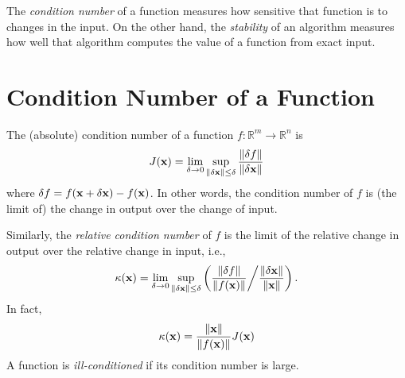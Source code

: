 \label{lab:conditioning_stability}



%

The \emph{condition number} of a function measures how sensitive that function is to changes in the input.
On the other hand, the \emph{stability} of an algorithm measures how well that algorithm computes the value of a function from exact input.

\section*{Condition Number of a Function}

The (absolute) condition number of a function $f: \mathbb{R}^m \rightarrow \mathbb{R}^n$ is
 \begin{equation}\label{equ:abs_cond}
J({\bf x}) = \lim_{\delta \rightarrow 0} \sup_{\left\lVert\delta {\bf x}\right\rVert \leq \delta} { \frac{\left\lVert\delta f\right\rVert}{\left\lVert\delta {\bf x}\right\rVert} }
\end{equation}
where $\delta f = f({\bf x}+\delta{\bf x})-f({\bf x})$.
In other words, the condition number of $f$ is (the limit of) the change in output over the change of input.

Similarly, the \emph{relative condition number} of $f$ is the limit of the relative change in output over the relative change in input, i.e.,
\begin{equation}\label{equ:rel_cond}
\kappa({\bf x}) = \lim_{\delta \rightarrow 0} \sup_{\left\lVert\delta {\bf x}\right\rVert \leq \delta} \left({ \frac{\left\lVert\delta f\right\rVert}{\left\lVert f({\bf x})\right\rVert} } \middle/ { \frac{\left\lVert\delta {\bf x}\right\rVert}{\left\lVert{\bf x}\right\rVert} }\right).
\end{equation}
In fact,
\[
\kappa({\bf x}) = \frac{\left\lVert{\bf x}\right\rVert}{\left\lVert f({\bf x})\right\rVert} J({\bf x})
\]
A function is \emph{ill-conditioned} if its condition number is large.



